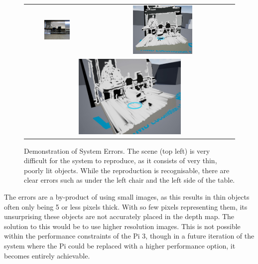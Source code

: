 \begin{figure}[H]
    \begin{center}
    \begin{tabular}{ c c }
        \includegraphics[width=0.43\textwidth,trim={0cm 0 1cm 0},clip]{Figures/TestScene3.jpg} &
        \includegraphics[width=0.43\textwidth]{Figures/TestUnreal3.jpg} \\
        \multicolumn{2}{c}{\includegraphics[width=0.5\textwidth]{Figures/TestUnreal3S.jpg}}
    \end{tabular}
    \caption[Demonstration of System Errors]{Demonstration of System Errors. The scene (top left) is very difficult for the system to reproduce, as it consists of very thin, poorly lit objects. While the reproduction is recognisable, there are clear errors such as under the left chair and the left side of the table.}
    \label{fig:UErrors}
    \end{center}
\end{figure}

The errors are a by-product of using small images, as this results in thin objects often only being 5 or less pixels thick. With so few pixels representing them, its unsurprising these objects are not accurately placed in the depth map. The solution to this would be to use higher resolution images. This is not possible within the performance constraints of the Pi 3, though in a future iteration of the system where the Pi could be replaced with a higher performance option, it becomes entirely achievable.

